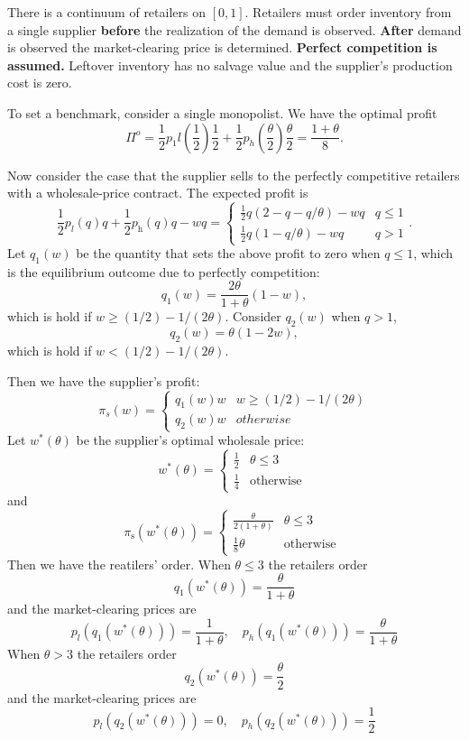 There is a continuum of retailers on $[0,1]$. Retailers must order inventory from a single supplier \textbf{before} the realization of the demand is observed. \textbf{After} demand is observed the market-clearing price is determined. \textbf{Perfect competition is assumed.} Leftover inventory has no salvage value and the supplier's production cost is zero. 

To set a benchmark, consider a single monopolist. We have the optimal profit
$$\Pi^o=\frac{1}{2}p_1l(
\frac{1}{2})\frac{1}{2}+\frac{1}{2}p_h(\frac{\theta}{2})\frac{\theta}{2}=\frac{1+\theta}{8}.$$

Now consider the case that the supplier sells to the perfectly competitive retailers with a wholesale-price contract. The expected profit is 
\begin{equation*}
    \frac{1}{2} p_{l}(q) q+\frac{1}{2} p_{\mathrm{h}}(q) q-w q= \begin{cases}\frac{1}{2} q(2-q-q / \theta)-w q & q \leq 1 \\ \frac{1}{2} q(1-q / \theta)-w q & q>1\end{cases}.   
\end{equation*}
Let $q_1(w)$ be the quantity that sets the above profit to zero when $q\leq 1$, which is the equilibrium outcome due to perfectly competition:
$$q_1(w)=\frac{2\theta}{1+\theta}(1-w),$$
which is hold if $w\geq (1/2)-1/(2\theta)$. Consider $q_2(w)$ when $q>1$,
$$q_2(w)=\theta(1-2w),$$
which is hold if $w<(1/2)-1/(2\theta)$.

Then we have the supplier's profit:
\begin{equation*}
    \pi_s(w)=\begin{cases}
        q_1(w)w & w\geq (1/2)-1/(2\theta)\\
        q_2(w)w&otherwise
    \end{cases}
\end{equation*}
Let $w^{*}(\theta)$ be the supplier's optimal wholesale price:
$$
w^{*}(\theta)= \begin{cases}\frac{1}{2} & \theta \leq 3 \\ \frac{1}{4} & \text {otherwise }\end{cases}
$$
and
$$
\pi_{\mathrm{s}}\left(w^{*}(\theta)\right)= \begin{cases}\frac{\theta}{2(1+\theta)} & \theta \leq 3 \\ \frac{1}{8} \theta & \text {otherwise }\end{cases}
$$
Then we have the reatilers' order. When $\theta \leq 3$ the retailers order
$$
q_{1}\left(w^{*}(\theta)\right)=\frac{\theta}{1+\theta}
$$
and the market-clearing prices are
$$
p_{l}\left(q_{1}\left(w^{*}(\theta)\right)\right)=\frac{1}{1+\theta}, \quad p_{h}\left(q_{1}\left(w^{*}(\theta)\right)\right)=\frac{\theta}{1+\theta}
$$
When $\theta>3$ the retailers order
$$
q_{2}\left(w^{*}(\theta)\right)=\frac{\theta}{2}
$$
and the market-clearing prices are
$$
p_{l}\left(q_{2}\left(w^{*}(\theta)\right)\right)=0, \quad p_{h}\left(q_{2}\left(w^{*}(\theta)\right)\right)=\frac{1}{2}
$$

